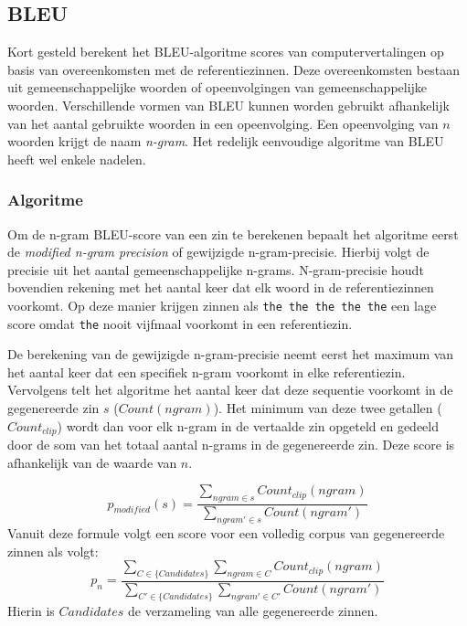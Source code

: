 \subsection{BLEU}
Kort gesteld berekent het BLEU-algoritme scores van computervertalingen op basis van overeenkomsten met de referentiezinnen. Deze overeenkomsten bestaan uit gemeenschappelijke woorden of opeenvolgingen van gemeenschappelijke woorden. Verschillende vormen van BLEU kunnen worden gebruikt afhankelijk van het aantal gebruikte woorden in een opeenvolging. Een opeenvolging van $n$ woorden krijgt de naam \emph{n-gram}. Het redelijk eenvoudige algoritme van BLEU heeft wel enkele nadelen.

\subsubsection{Algoritme}
Om de n-gram BLEU-score van een zin te berekenen bepaalt het algoritme eerst de \textit{modified n-gram precision} of gewijzigde n-gram-precisie. Hierbij volgt de precisie uit het aantal gemeenschappelijke n-grams. N-gram-precisie houdt bovendien rekening met het aantal keer dat elk woord in de referentiezinnen voorkomt. Op deze manier krijgen zinnen als \texttt{the the the the the} een lage score omdat \texttt{the} nooit vijfmaal voorkomt in een referentiezin. 

De berekening van de gewijzigde n-gram-precisie neemt eerst het maximum van het aantal keer dat een specifiek n-gram voorkomt in elke referentiezin. Vervolgens telt het algoritme het aantal keer dat deze sequentie voorkomt in de gegenereerde zin $s$ ($Count(ngram)$). Het minimum van deze twee getallen ($Count_ {clip}$) wordt dan voor elk n-gram in de vertaalde zin opgeteld en gedeeld door de som van het totaal aantal n-grams in de gegenereerde zin. Deze score is afhankelijk van de waarde van $n$.

\begin{equation}
p_{modified}(s) =
\frac{\sum\limits_{ngram \in s} Count_{clip}(ngram)}{\sum\limits_{ngram' \in s} Count(ngram')}
\label{formule:ngramprecision}
\end{equation}
Vanuit deze formule volgt een score voor een volledig corpus van gegenereerde zinnen als volgt:
\begin{equation}
p_{n} =
\frac{\sum\limits_{C \in \{Candidates\} } \sum\limits_{ngram \in C} Count_{clip}(ngram)}{\sum\limits_{C' \in \{Candidates\} } \sum\limits_{ngram' \in C'} Count(ngram')}
\label{formule:corpus_modified}
\end{equation}
Hierin is $Candidates$ de verzameling van alle gegenereerde zinnen.

